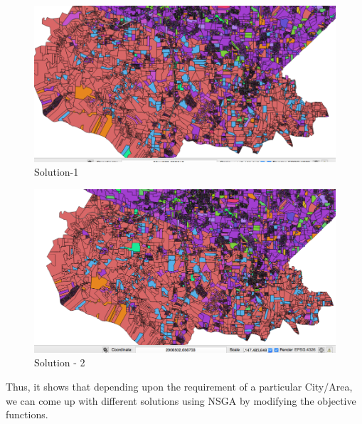 \documentclass{sig-alternate}
\begin{document}
\begin{figure}
\centering
\includegraphics[width=4.5in]{Sol1.png}
\caption{Solution-1}
\end{figure}
\begin{figure}
\centering
\includegraphics[width=4.5in]{Sol2.png}
\caption{Solution - 2}
\end{figure}

 Thus, it shows that depending upon the requirement of a particular City/Area, we can come up with different solutions using NSGA by modifying the objective functions.
 
\end{document}
